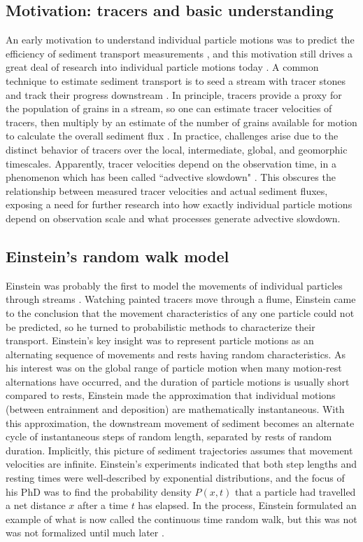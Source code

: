 \subsection{Motivation: tracers and basic understanding}
An early motivation to understand individual particle motions was to predict the efficiency of sediment transport measurements \citep{Ettema2004}, and this motivation still drives a great deal of research into individual particle motions today \citep{Hassan2017,Pretzlav2021}.
A common technique to estimate sediment transport is to seed a stream with tracer stones and track their progress downstream \citep{Einstein1937, Takayama1965, Pretzlav2021}.
In principle, tracers provide a proxy for the population of grains in a stream, so one can estimate tracer velocities of tracers, then multiply by an estimate of the number of grains available for motion to calculate the overall sediment flux \citep{Wilcock1997a,Ferguson2002}.
In practice, challenges arise due to the distinct behavior of tracers over the local, intermediate, global, and geomorphic timescales. Apparently, tracer velocities depend on the observation time, in a phenomenon which has been called ``advective slowdown" \citep{Ferguson2002,Haschenburger2011, Haschenburger2013, Pelosi2016}. This obscures the relationship between measured tracer velocities and actual sediment fluxes, exposing a need for further research into how exactly individual particle motions depend on observation scale and what processes generate advective slowdown.

\subsection{Einstein's random walk model}
\label{sec:einwalk}
Einstein was probably the first to model the movements of individual particles through streams \citep{Einstein1937}.
Watching painted tracers move through a flume, Einstein came to the conclusion that the movement characteristics of any one particle could not be predicted, so he turned to probabilistic methods to characterize their transport.
Einstein's key insight was to represent particle motions as an alternating sequence of movements and rests having random characteristics.
As his interest was on the global range of particle motion when many motion-rest alternations have occurred, and the duration of particle motions is usually short compared to rests, Einstein made the approximation that individual motions (between entrainment and deposition) are mathematically instantaneous.
With this approximation, the downstream movement of sediment becomes an alternate cycle of instantaneous steps of random length, separated by rests of random duration. 
Implicitly, this picture of sediment trajectories assumes that movement velocities are infinite.
Einstein's experiments indicated that both step lengths and resting times were well-described by exponential distributions, and the focus of his PhD was to find the probability density $P(x,t)$ that a particle had travelled a net distance $x$ after a time $t$ has elapsed. In the process, Einstein formulated an example of what is now called the continuous time random walk, but this was not was not formalized until much later \citep{Montroll1965}.

